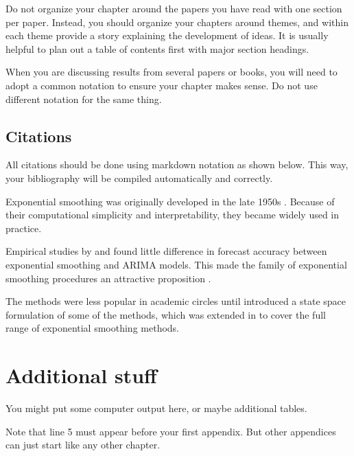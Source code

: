 \documentclass{monashthesis}
\begin{document}
Do not organize your chapter around the papers you have read with one section per paper. Instead, you should organize your chapters around themes, and within each theme provide a story explaining the development of ideas. It is usually helpful to plan out a table of contents first with major section headings.

When you are discussing results from several papers or books, you will need to adopt a common notation to ensure your chapter makes sense. Do not use different notation for the same thing.

\hypertarget{citations}{%
\section{Citations}\label{citations}}

All citations should be done using markdown notation as shown below. This way, your bibliography will be compiled automatically and correctly.

Exponential smoothing was originally developed in the late 1950s \autocite{Brown59,Brown63,Holt57,Winters60}. Because of their computational simplicity and interpretability, they became widely used in practice.

Empirical studies by \textcite{MH79} and \textcite{Metal82} found little difference in forecast accuracy between exponential smoothing and ARIMA models. This made the family of exponential smoothing procedures an attractive proposition \autocite[see][]{CKOS01}.

The methods were less popular in academic circles until \textcite{OKS97} introduced a state space formulation of some of the methods, which was extended in \textcite{HKSG02} to cover the full range of exponential smoothing methods.

\appendix

\hypertarget{additional-stuff}{%
\chapter{Additional stuff}\label{additional-stuff}}

You might put some computer output here, or maybe additional tables.

Note that line 5 must appear before your first appendix. But other appendices can just start like any other chapter.

\printbibliography[heading=bibintoc]
\end{document}
